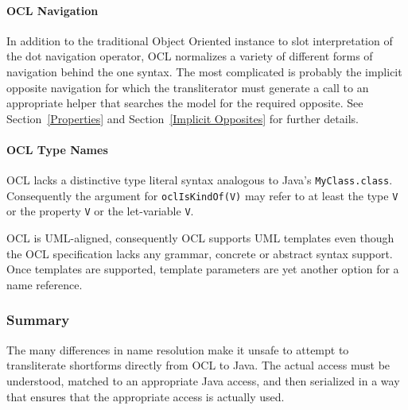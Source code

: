\documentclass[sigconf]{acmart}
\begin{document}
\paragraph{OCL Navigation}


In addition to the traditional Object Oriented instance to slot interpretation of the dot navigation operator, OCL normalizes a variety of different forms of navigation behind the one syntax. The most complicated is probably the implicit opposite navigation for which the transliterator must generate a call to an appropriate helper that searches the model for the required opposite. See Section~\ref{Properties}  and Section~\ref{Implicit Opposites} for further details.

\paragraph{OCL Type Names}

OCL lacks a distinctive type literal syntax analogous to Java's \texttt{MyClass.class}. Consequently the argument for \texttt{oclIsKindOf(V)} may refer to at least the type \texttt{V} or the property \texttt{V} or the let-variable \texttt{V}.

OCL is UML-aligned, consequently OCL supports UML templates even though the OCL specification lacks any grammar, concrete or abstract syntax support. Once templates are  supported, template parameters are yet another option for a name reference.

\subsubsection{Summary}

The many differences in name resolution make it unsafe to attempt to transliterate shortforms directly from OCL to Java. The actual access must be understood, matched to an appropriate Java access, and then serialized in a way that ensures that the appropriate access is actually used.
\end{document}
